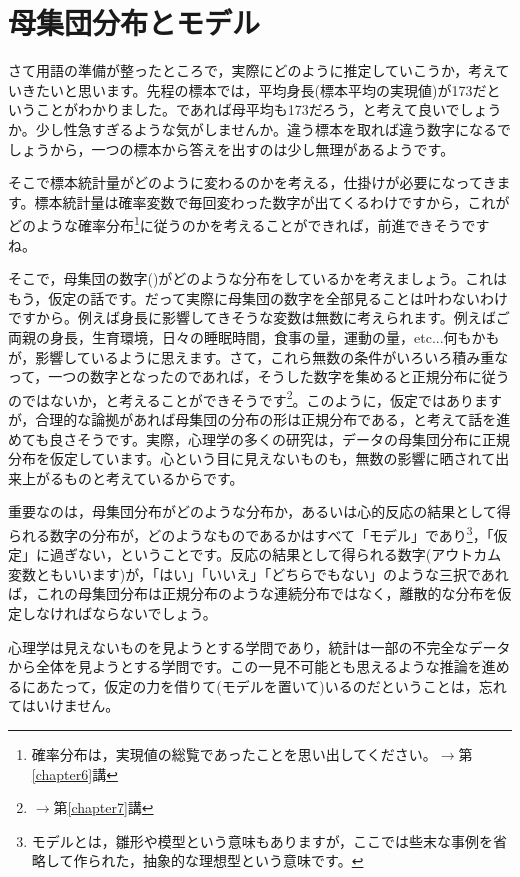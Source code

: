 \documentclass{ltjsbook}
\begin{document}
\section{母集団分布とモデル}
さて用語の準備が整ったところで，実際にどのように推定していこうか，考えていきたいと思います。先程の標本では，平均身長(標本平均の実現値)が173だということがわかりました。であれば母平均も173だろう，と考えて良いでしょうか。少し性急すぎるような気がしませんか。違う標本を取れば違う数字になるでしょうから，一つの標本から答えを出すのは少し無理があるようです。

そこで標本統計量がどのように変わるのかを考える，仕掛けが必要になってきます。標本統計量は確率変数で毎回変わった数字が出てくるわけですから，これがどのような確率分布\footnote{確率分布は，実現値の総覧であったことを思い出してください。$\to$第\ref{chapter6}講}に従うのかを考えることができれば，前進できそうですね。

そこで，母集団の数字()がどのような分布をしているかを考えましょう。これはもう，仮定の話です。だって実際に母集団の数字を全部見ることは叶わないわけですから。例えば身長に影響してきそうな変数は無数に考えられます。例えばご両親の身長，生育環境，日々の睡眠時間，食事の量，運動の量，etc...何もかもが，影響しているように思えます。さて，これら無数の条件がいろいろ積み重なって，一つの数字となったのであれば，そうした数字を集めると正規分布に従うのではないか，と考えることができそうです\footnote{$\to$第\ref{chapter7}講}。このように，仮定ではありますが，合理的な論拠があれば母集団の分布の形は正規分布である，と考えて話を進めても良さそうです。実際，心理学の多くの研究は，データの母集団分布に正規分布を仮定しています。心という目に見えないものも，無数の影響に晒されて出来上がるものと考えているからです。

重要なのは，母集団分布がどのような分布か，あるいは心的反応の結果として得られる数字の分布が，どのようなものであるかはすべて「モデル」であり\footnote{モデルとは，雛形や模型という意味もありますが，ここでは些末な事例を省略して作られた，抽象的な理想型という意味です。}，「仮定」に過ぎない，ということです。反応の結果として得られる数字(アウトカム変数ともいいます)が，「はい」「いいえ」「どちらでもない」のような三択であれば，これの母集団分布は正規分布のような連続分布ではなく，離散的な分布を仮定しなければならないでしょう。

心理学は見えないものを見ようとする学問であり，統計は一部の不完全なデータから全体を見ようとする学問です。この一見不可能とも思えるような推論を進めるにあたって，仮定の力を借りて(モデルを置いて)いるのだということは，忘れてはいけません。
\end{document}
